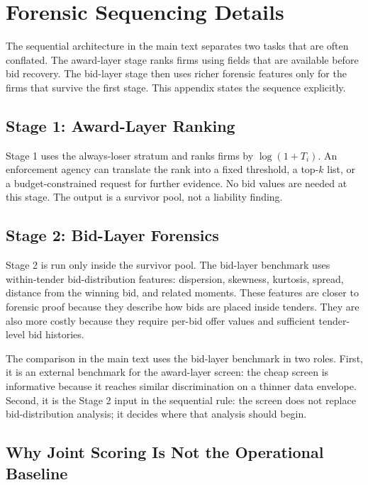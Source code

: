\section{Forensic Sequencing Details}
\label{app:forensic_sequence_v18}

The sequential architecture in the main text separates two tasks
that are often conflated. The award-layer stage ranks firms using
fields that are available before bid recovery. The bid-layer
stage then uses richer forensic features only for the firms that
survive the first stage. This appendix states the sequence
explicitly.

\subsection{Stage 1: Award-Layer Ranking}
\label{app:stage1_v18}

Stage 1 uses the always-loser stratum and ranks firms by
$\log(1+T_i)$. An enforcement agency can translate the rank into
a fixed threshold, a top-$k$ list, or a budget-constrained request
for further evidence. No bid values are needed at this stage.
The output is a survivor pool, not a liability finding.

\subsection{Stage 2: Bid-Layer Forensics}
\label{app:stage2_v18}

Stage 2 is run only inside the survivor pool. The bid-layer
benchmark uses within-tender bid-distribution features:
dispersion, skewness, kurtosis, spread, distance from the winning
bid, and related moments. These features are closer to forensic
proof because they describe how bids are placed inside tenders.
They are also more costly because they require per-bid offer
values and sufficient tender-level bid histories.

The comparison in the main text uses the bid-layer benchmark in
two roles. First, it is an external benchmark for the award-layer
screen: the cheap screen is informative because it reaches
similar discrimination on a thinner data envelope. Second, it is
the Stage 2 input in the sequential rule: the screen does not
replace bid-distribution analysis; it decides where that analysis
should begin.

\subsection{Why Joint Scoring Is Not the Operational Baseline}
\label{app:joint_scoring_v18}

